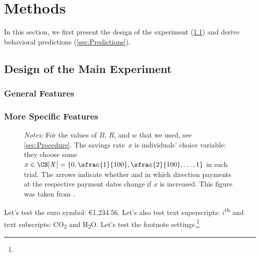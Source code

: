 



\section{Methods}
\label{sec:Methods}

In this section, we first present the design of the experiment (\ref{sec:design}) and derive behavioral predictions (\ref{sec:Predictions}).

\subsection{Design of the Main Experiment}
\label{sec:design}

\subsubsection{General Features}
\blindtext

\subsubsection{More Specific Features}
\blindtext

\begin{figure}[tp!]
	\RawFloats
	\centering
	
	\smallskip
	
	\bigskip
	\begin{minipage}{\textwidth}%
		\footnotesize\setlength{\baselineskip}{11pt}%
		\textit{Notes:} For the values of $B$, $R$, and $w$ that we used, see \autoref{sec:Procedure}. The savings rate~$x$ is individuals' choice variable: they choose some $x \in \CS[X] = {\{0, \sfrac{1}{100}, \sfrac{2}{100}, \dots, 1\}}$ in each trial.
		The arrows indicate whether and in which direction payments at the respective payment dates change if $x$ is increased.
		This figure was taken from \cite{Dertwinkel-Kalt2017}.
	\end{minipage}
\end{figure}

Let's test the euro symbol: \euro 1,234.56. Let's also test text superscripts: $i$\textsuperscript{th} and text subscripts: CO\textsubscript{2} and H\textsubscript{2}O.
\blindtext
Let's test the footnote settings.\footnote{\blindmathfalse\blindtext\blindmathtrue} 

